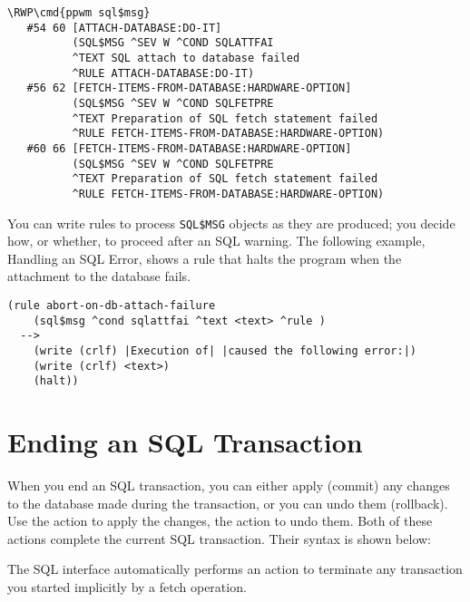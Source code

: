 \begin{exampl}
\begin{Verbatim}[commandchars=\\\{\}]
\RWP\cmd{ppwm sql$msg}
   #54 60 [ATTACH-DATABASE:DO-IT]
          (SQL$MSG ^SEV W ^COND SQLATTFAI 
          ^TEXT SQL attach to database failed 
          ^RULE ATTACH-DATABASE:DO-IT)
   #56 62 [FETCH-ITEMS-FROM-DATABASE:HARDWARE-OPTION]
          (SQL$MSG ^SEV W ^COND SQLFETPRE 
          ^TEXT Preparation of SQL fetch statement failed
          ^RULE FETCH-ITEMS-FROM-DATABASE:HARDWARE-OPTION)
   #60 66 [FETCH-ITEMS-FROM-DATABASE:HARDWARE-OPTION]
          (SQL$MSG ^SEV W ^COND SQLFETPRE 
          ^TEXT Preparation of SQL fetch statement failed 
          ^RULE FETCH-ITEMS-FROM-DATABASE:HARDWARE-OPTION)
\end{Verbatim}
\end{exampl}
  
You can write rules to process
\verb|SQL$MSG| objects as they are produced; you decide how, or
whether, to proceed after an SQL warning. The following example,
Handling an SQL Error, shows a rule that halts the program when the
attachment to the database fails.

\begin{exampl}
\begin{verbatim}
(rule abort-on-db-attach-failure
    (sql$msg ^cond sqlattfai ^text <text> ^rule )
  -->
    (write (crlf) |Execution of| |caused the following error:|)
    (write (crlf) <text>)
    (halt))
\end{verbatim}
\end{exampl}

\section{Ending an SQL Transaction}

When you end an SQL transaction, you can either apply (commit) any
changes to the database made during the transaction, or you can undo
them (rollback). Use the  action to apply the changes, the
 action to undo them. Both of these actions complete the
current SQL transaction. Their syntax is shown below:

\begin{quote}

\end{quote}

The SQL interface automatically performs an  action to
terminate any transaction you started implicitly by a fetch operation.

